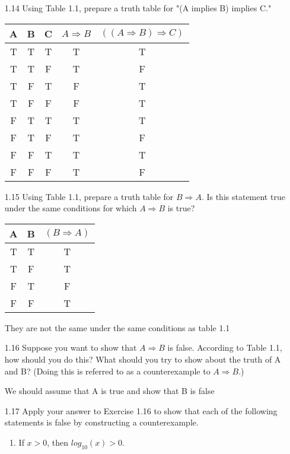 \documentclass[11pt]{article}
\begin{document}
\begin{enumerate}
\begin{table}[H]
\begin{tabular}{|c|c|c|c|c|}
   \end{tabular}
   \end{table}
   \item[1.14]Using Table 1.1, prepare a truth table for "(A implies B) implies C."\par
   \begin{table}[H]
   \def\arraystretch{1.5}
   \begin{tabular}{|c|c|c|c|c|}
    \hline
    A & B & C &$A \Rightarrow B$&$\left( \left(A \Rightarrow B\right) \Rightarrow C \right)$\\\hline
    T & T & T & T & T\\\hline
    T & T & F & T & F\\\hline
    T & F & T & F & T\\\hline
    T & F & F & F & T\\\hline
    F & T & T & T & T\\\hline
    F & T & F & T & F\\\hline
    F & F & T & T & T\\\hline
    F & F & F & T & F\\\hline
   \end{tabular}
   \end{table}
   \item[1.15]Using Table 1.1, prepare a truth table for $B \Rightarrow A$. Is this statement true under the same conditions for which $A \Rightarrow B$ is true?\par
   \begin{table}[H]
   \def\arraystretch{1.5}
   \begin{tabular}{|c|c|c|}
    \hline
    A & B & $\left(B \Rightarrow A\right)$ \\\hline
    T & T & T \\\hline
    T & F & T \\\hline
    F & T & F \\\hline
    F & F & T \\\hline
   \end{tabular}
   \end{table}
   They are not the same under the same conditions as table 1.1
   \item[1.16]Suppose you want to show that $A \Rightarrow B$ is false. According to Table 1.1, how should you do this? What should you try to show about the truth of A and B? (Doing this is referred to as a counterexample to $A \Rightarrow B$.)\par 
   We should assume that A is true and show that B is false
   \item[1.17]Apply your answer to Exercise 1.16 to show that each of the following statements is false by constructing a counterexample.\par 
   \begin{enumerate}
     \item If $x > 0$, then $log_{10} (x) > 0$.
   \end{enumerate}
 \end{enumerate}
\end{document}
